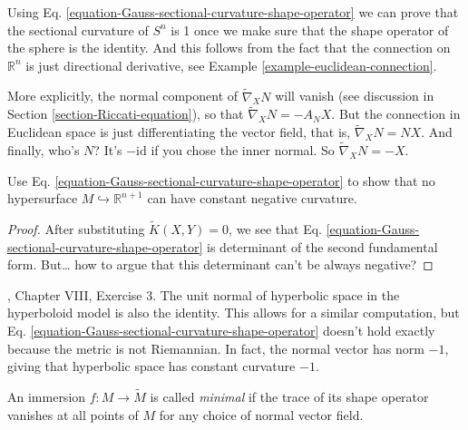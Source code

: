 \begin{example}
\label{example-sectional-curvature-of-sphere}
Using Eq. \ref{equation-Gauss-sectional-curvature-shape-operator} we can prove that the sectional
curvature of $S^n$ is 1 once we make sure that the shape operator of the sphere
is the identity. And this follows from the fact that the connection on
$\mathbb{R}^n$ is just directional derivative, see Example 
\ref{example-euclidean-connection}.

More explicitly, the normal component of $\tilde{\nabla}_X N$ will vanish (see
discussion in Section \ref{section-Riccati-equation}), so that
$\tilde{\nabla}_XN=-A_N X$. But the connection in Euclidean space is just
differentiating the vector field, that is, $\tilde{\nabla}_X N=N X$. And
finally, who's $N$? It's $-\text{id}$ if you chose the inner normal. So
 $\tilde{\nabla}_X N=-X$.
\end{example}

\begin{exercise}
\label{exercise-Gauss-sectional}
Use Eq. \ref{equation-Gauss-sectional-curvature-shape-operator} to show that no 
hypersurface $M \hookrightarrow \mathbb{R}^{n+1}$ can have constant negative 
curvature.
\end{exercise}

\begin{proof}
After substituting $\tilde{K}(X,Y)=0$, we see that Eq. 
\ref{equation-Gauss-sectional-curvature-shape-operator} is determinant of the second fundamental form. 
 But… how to argue that this determinant can't be always negative?
\end{proof}

\begin{example}
\label{example-hyperbolic-space}
\cite{doc}, Chapter VIII, Exercise 3. The unit normal of hyperbolic space in the
hyperboloid model is also the identity. This allows for a similar computation,
but Eq. \ref{equation-Gauss-sectional-curvature-shape-operator} doesn't hold 
exactly because the
metric is not Riemannian. In fact, the normal vector has norm $-1$, giving that
hyperbolic space has constant curvature $-1$.
\end{example}

\begin{definition}
\label{definition-minimal-immersion}
An immersion $f:M\to\tilde{M}$ is called {\it minimal} if the trace of its shape
operator vanishes at all points of $M$ for any choice of normal vector field.
\end{definition}

